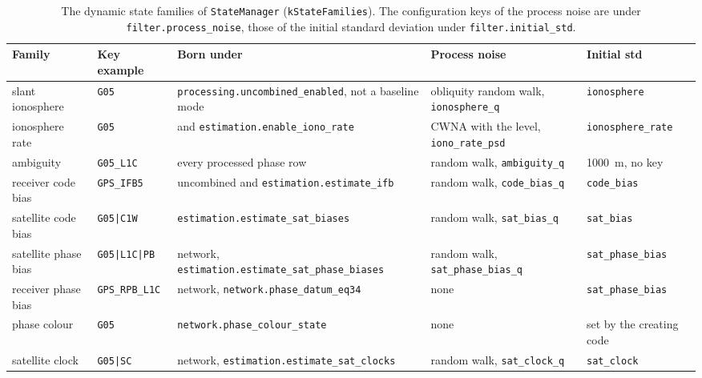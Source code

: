 \begin{table}[tbp]
\centering
\caption{The dynamic state families of \texttt{StateManager}
(\texttt{kStateFamilies}).  The configuration keys of the process noise are
under \texttt{filter.process\_noise}, those of the initial standard deviation
under \texttt{filter.initial\_std}.}
\label{tab:state-families}
\small
\begin{tabular}{@{}>{\raggedright\arraybackslash}p{2.7cm}
                >{\raggedright\arraybackslash}p{2.3cm}
                >{\raggedright\arraybackslash}p{4.3cm}
                >{\raggedright\arraybackslash}p{3.2cm}
                >{\raggedright\arraybackslash}p{2.0cm}@{}}
\toprule
Family & Key example & Born under & Process noise & Initial std \\
\midrule
slant ionosphere & \texttt{G05} & \texttt{processing.uncombined\_enabled}, not a baseline mode & obliquity random walk, \texttt{ionosphere\_q} & \texttt{ionosphere} \\
ionosphere rate & \texttt{G05} & and \texttt{estimation.enable\_iono\_rate} & CWNA with the level, \texttt{iono\_rate\_psd} & \texttt{ionosphere\_rate} \\
ambiguity & \texttt{G05\_L1C} & every processed phase row & random walk, \texttt{ambiguity\_q} & \SI{1000}{m}, no key \\
receiver code bias & \texttt{GPS\_IFB5} & uncombined and \texttt{estimation.estimate\_ifb} & random walk, \texttt{code\_bias\_q} & \texttt{code\_bias} \\
satellite code bias & \texttt{G05|C1W} & \texttt{estimation.estimate\_sat\_biases} & random walk, \texttt{sat\_bias\_q} & \texttt{sat\_bias} \\
satellite phase bias & \texttt{G05|L1C|PB} & network, \texttt{estimation.estimate\_sat\_phase\_biases} & random walk, \texttt{sat\_phase\_bias\_q} & \texttt{sat\_phase\_bias} \\
receiver phase bias & \texttt{GPS\_RPB\_L1C} & network, \texttt{network.phase\_datum\_eq34} & none & \texttt{sat\_phase\_bias} \\
phase colour & \texttt{G05} & \texttt{network.phase\_colour\_state} & none & set by the creating code \\
satellite clock & \texttt{G05|SC} & network, \texttt{estimation.estimate\_sat\_clocks} & random walk, \texttt{sat\_clock\_q} & \texttt{sat\_clock} \\
\bottomrule
\end{tabular}
\end{table}

